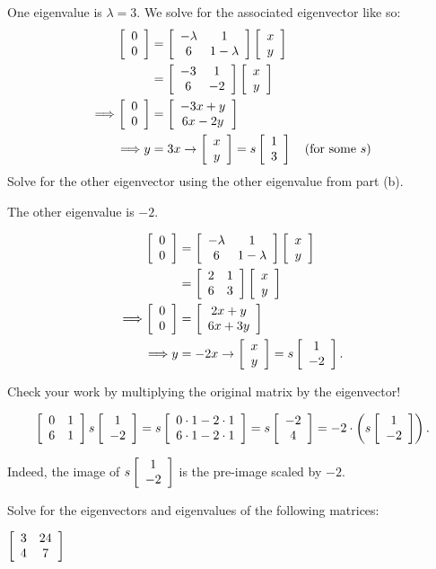 \documentclass[../key.tex]{subfiles}
\begin{document}
\begin{inner_problem}
\item One eigenvalue is $\lambda=3$. We solve for the associated eigenvector like so:
\begin{align*}
\twovec{0}{0} &= \twomat{-\lambda}{1}{6}{1-\lambda}\twovec{x}{y} \\
&= \twomat{-3}{1}{6}{-2}\twovec{x}{y} \\
\Longrightarrow \twovec{0}{0} &= \twovec{-3x+y}{6x-2y} \\
\Longrightarrow y&=3x \rightarrow \twovec{x}{y}=s\twovec{1}{3}\quad \text{(for some }s\text{)}
\end{align*}
Solve for the other eigenvector using the other eigenvalue from part (b).
\end{inner_problem}

The other eigenvalue is $-2$.

\begin{align*}
\twovec{0}{0} &= \twomat{-\lambda}{1}{6}{1-\lambda}\twovec{x}{y} \\
&= \twomat{2}{1}{6}{3}\twovec{x}{y} \\
\Longrightarrow \twovec{0}{0} &= \twovec{2x+y}{6x+3y} \\
\Longrightarrow y&=-2x \rightarrow \twovec{x}{y}=s\twovec{1}{-2}.
\end{align*}

\begin{inner_problem}
\item Check your work by multiplying the original matrix by the eigenvector!
\end{inner_problem}

$$\twomat{0}{1}{6}{1}s\twovec{1}{-2} = s\twovec{0\cdot 1 - 2\cdot 1}{6\cdot 1 - 2\cdot 1} = s\twovec{-2}{4} = -2\cdot\left(s\twovec{1}{-2}\right).$$

Indeed, the image of $s\twovec{1}{-2}$ is the pre-image scaled by $-2$.

\begin{outer_problem}
\item Solve for the eigenvectors and eigenvalues of the following matrices:
\end{outer_problem}

\begin{inner_problem}[start=1]
\item $\twomat{3}{24}{4}{7}$
\end{inner_problem}
\end{document}
